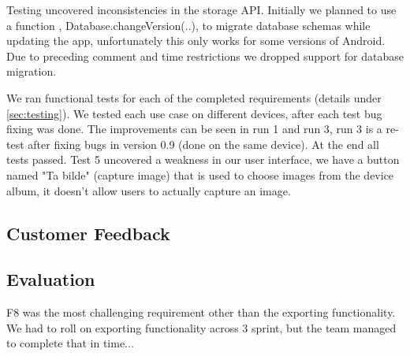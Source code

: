 Testing uncovered inconsistencies in the storage API. Initially we planned to
use a function , Database.changeVersion(..), to migrate database schemas while
updating the app, unfortunately this only works for some versions of Android.
Due to preceding comment and time restrictions we dropped support for database
migration.

We ran functional tests for each of the completed requirements (details under
\ref{sec:testing}). We tested each use case on different devices, after each test bug
fixing was done. The improvements can be seen in run 1 and run 3, run 3 is a
re-test after fixing bugs in version 0.9 (done on the same device). At the end
all tests passed. Test 5 uncovered a weakness in our user interface, we have a
button named "Ta bilde" (capture image) that is used to choose images from the device
album, it doesn't allow users to actually capture an image.

\subsection{Customer Feedback}

\subsection{Evaluation}

F8 was the most challenging requirement other than the exporting functionality.
We had to roll on exporting functionality across 3 sprint, but the team managed
to complete that in time...
